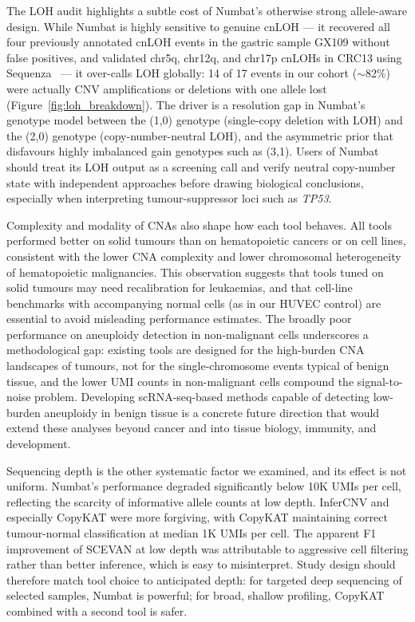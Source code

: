 \documentclass[11pt]{article}
\begin{document}
The LOH audit highlights a subtle cost of Numbat's otherwise strong
allele-aware design. While Numbat is highly sensitive to genuine cnLOH ---
it recovered all four previously annotated cnLOH events in the gastric
sample GX109 without false positives, and validated chr5q, chr12q, and
chr17p cnLOHs in CRC13 using Sequenza~\cite{favero2015sequenza} --- it
over-calls LOH globally: 14 of 17 events in our cohort ($\sim$82\%) were
actually CNV amplifications or deletions with one allele lost
(Figure~\ref{fig:loh_breakdown}). The driver is a resolution gap in
Numbat's genotype model between the (1,0) genotype (single-copy deletion
with LOH) and the (2,0) genotype (copy-number-neutral LOH), and the
asymmetric prior that disfavours highly imbalanced gain genotypes such as
(3,1). Users of Numbat should treat its LOH output as a screening call and
verify neutral copy-number state with independent approaches before drawing
biological conclusions, especially when interpreting tumour-suppressor loci
such as \emph{TP53}.

Complexity and modality of CNAs also shape how each tool behaves. All tools
performed better on solid tumours than on hematopoietic cancers or on cell
lines, consistent with the lower CNA complexity and lower chromosomal
heterogeneity of hematopoietic malignancies. This observation suggests that
tools tuned on solid tumours may need recalibration for leukaemias, and that
cell-line benchmarks with accompanying normal cells (as in our HUVEC
control) are essential to avoid misleading performance estimates. The
broadly poor performance on aneuploidy detection in non-malignant cells
underscores a methodological gap: existing tools are designed for the
high-burden CNA landscapes of tumours, not for the single-chromosome events
typical of benign tissue, and the lower UMI counts in non-malignant cells
compound the signal-to-noise problem. Developing scRNA-seq-based methods
capable of detecting low-burden aneuploidy in benign tissue is a concrete
future direction that would extend these analyses beyond cancer and into
tissue biology, immunity, and development.

Sequencing depth is the other systematic factor we examined, and its effect
is not uniform. Numbat's performance degraded significantly below 10K UMIs
per cell, reflecting the scarcity of informative allele counts at low
depth. InferCNV and especially CopyKAT were more forgiving, with CopyKAT
maintaining correct tumour-normal classification at median 1K UMIs per
cell. The apparent F1 improvement of SCEVAN at low depth was attributable to
aggressive cell filtering rather than better inference, which is easy to
misinterpret. Study design should therefore match tool choice to
anticipated depth: for targeted deep sequencing of selected samples, Numbat
is powerful; for broad, shallow profiling, CopyKAT combined with a second
tool is safer.
\end{document}
